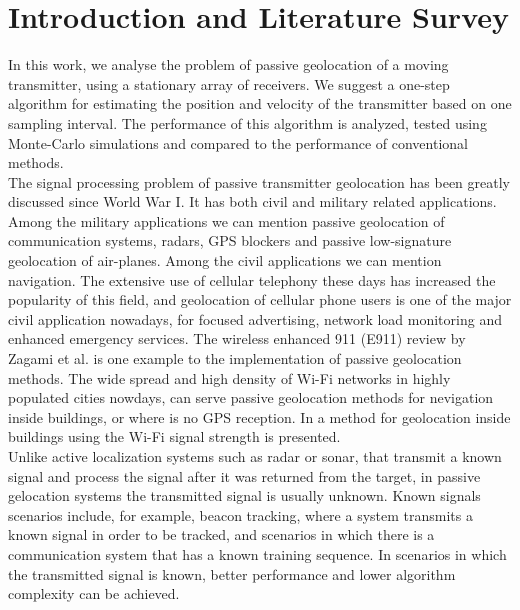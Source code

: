 
\chapter{Introduction and Literature Survey} %
\label{Chapter1}

In this work, we analyse the problem of passive geolocation of a moving transmitter, using
a stationary array of receivers. We suggest a one-step algorithm for estimating the position and velocity of the transmitter based on one sampling interval. The performance of this algorithm is analyzed, tested using Monte-Carlo simulations and compared to the performance of conventional methods.\\

The signal processing problem of passive transmitter geolocation has been greatly discussed since World War I. It has both civil and military related applications. Among the military applications we can mention passive geolocation of communication systems, radars, GPS blockers and passive low-signature geolocation of air-planes. Among the civil applications we can mention navigation. The extensive use of cellular telephony these days has increased the popularity of this field, and geolocation of cellular phone users is one of the major civil application nowadays, for focused advertising, network load monitoring and enhanced emergency services. The wireless enhanced 911 (E911) review by Zagami et al.\cite{zagami} is one example to the implementation of passive geolocation methods. The wide spread and high density of Wi-Fi networks in highly populated cities nowdays, can serve passive geolocation methods for nevigation inside buildings, or where is no GPS reception. In \cite{wifi} a method for geolocation inside buildings using the Wi-Fi signal strength is presented.\\

Unlike active localization systems such as radar or sonar, that transmit a known signal and process the signal after it was returned from the target, in passive gelocation systems the transmitted signal is usually unknown. Known signals scenarios include, for example, beacon tracking, where a system transmits a known signal in order to be tracked, and scenarios in which there is a communication system that has a known training sequence. In scenarios in which the transmitted signal is known, better performance and lower algorithm complexity can be achieved.\\

